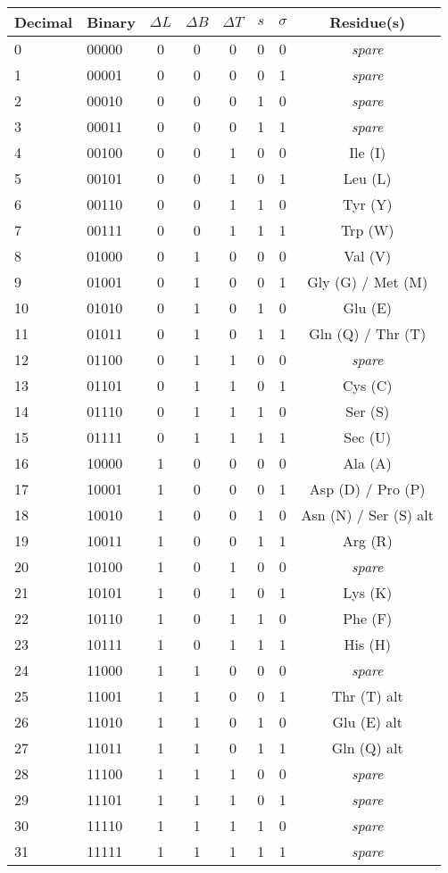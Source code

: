 \documentclass[11pt]{article}
\begin{document}
\begin{center}\small
\setlength{\tabcolsep}{5pt}
\renewcommand{\arraystretch}{1.15}
\begin{tabular}{@{}llcccccc@{}}
\toprule
Decimal & Binary & $\Delta L$ & $\Delta B$ & $\Delta T$ & $s$ & $\sigma$ & Residue(s) \\ 
\midrule
0  & 00000 & 0 & 0 & 0 & 0 & 0 & \textit{spare} \\ 
1  & 00001 & 0 & 0 & 0 & 0 & 1 & \textit{spare} \\ 
2  & 00010 & 0 & 0 & 0 & 1 & 0 & \textit{spare} \\ 
3  & 00011 & 0 & 0 & 0 & 1 & 1 & \textit{spare} \\ 
4  & 00100 & 0 & 0 & 1 & 0 & 0 & Ile (I) \\ 
5  & 00101 & 0 & 0 & 1 & 0 & 1 & Leu (L) \\ 
6  & 00110 & 0 & 0 & 1 & 1 & 0 & Tyr (Y) \\ 
7  & 00111 & 0 & 0 & 1 & 1 & 1 & Trp (W) \\ 
8  & 01000 & 0 & 1 & 0 & 0 & 0 & Val (V) \\ 
9  & 01001 & 0 & 1 & 0 & 0 & 1 & Gly (G) / Met (M) \\ 
10 & 01010 & 0 & 1 & 0 & 1 & 0 & Glu (E) \\ 
11 & 01011 & 0 & 1 & 0 & 1 & 1 & Gln (Q) / Thr (T) \\ 
12 & 01100 & 0 & 1 & 1 & 0 & 0 & \textit{spare} \\ 
13 & 01101 & 0 & 1 & 1 & 0 & 1 & Cys (C) \\ 
14 & 01110 & 0 & 1 & 1 & 1 & 0 & Ser (S) \\ 
15 & 01111 & 0 & 1 & 1 & 1 & 1 & Sec (U) \\ 
16 & 10000 & 1 & 0 & 0 & 0 & 0 & Ala (A) \\ 
17 & 10001 & 1 & 0 & 0 & 0 & 1 & Asp (D) / Pro (P) \\ 
18 & 10010 & 1 & 0 & 0 & 1 & 0 & Asn (N) / Ser (S) alt \\ 
19 & 10011 & 1 & 0 & 0 & 1 & 1 & Arg (R) \\ 
20 & 10100 & 1 & 0 & 1 & 0 & 0 & \textit{spare} \\ 
21 & 10101 & 1 & 0 & 1 & 0 & 1 & Lys (K) \\ 
22 & 10110 & 1 & 0 & 1 & 1 & 0 & Phe (F) \\ 
23 & 10111 & 1 & 0 & 1 & 1 & 1 & His (H) \\ 
24 & 11000 & 1 & 1 & 0 & 0 & 0 & \textit{spare} \\ 
25 & 11001 & 1 & 1 & 0 & 0 & 1 & Thr (T) alt \\ 
26 & 11010 & 1 & 1 & 0 & 1 & 0 & Glu (E) alt \\ 
27 & 11011 & 1 & 1 & 0 & 1 & 1 & Gln (Q) alt \\ 
28 & 11100 & 1 & 1 & 1 & 0 & 0 & \textit{spare} \\ 
29 & 11101 & 1 & 1 & 1 & 0 & 1 & \textit{spare} \\ 
30 & 11110 & 1 & 1 & 1 & 1 & 0 & \textit{spare} \\ 
31 & 11111 & 1 & 1 & 1 & 1 & 1 & \textit{spare} \\ 
\bottomrule
\end{tabular}
\end{center}
\end{document}
